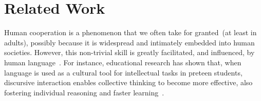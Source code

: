 
\section{Related Work}
\label{sec:related_work}

Human cooperation is a phenomenon that we often take for granted~(at least in adults), possibly because it is widespread and intimately embedded into human societies.
However, this non-trivial skill is greatly facilitated, and influenced, by human language~\cite{mueller:2000:psych}.
For instance, educational research has shown that, when language is used as a cultural tool for intellectual tasks in preteen students, discursive interaction enables collective thinking to become more effective, also fostering individual reasoning and faster learning~\cite{rojas:2003:ijer}. %

